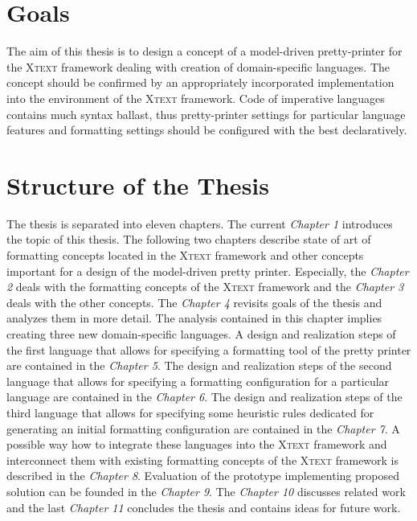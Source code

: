 \documentclass[12pt,notitlepage,a4paper]{report}
\begin{document}
\section{Goals}

The aim of this thesis is to design a concept of a model-driven pretty-printer for the \textsc{Xtext} framework \cite{Xtext} dealing with creation of domain-specific languages. The concept should be confirmed by an appropriately incorporated implementation into the environment of the \textsc{Xtext} framework. Code of imperative languages contains much syntax ballast, thus pretty-printer settings for particular language features and formatting settings should be configured with the best declaratively.

\section{Structure of the Thesis}

The thesis is separated into eleven chapters. The current \textit{Chapter 1} introduces the topic of this thesis. The following two chapters describe state of art of formatting concepts located in the \textsc{Xtext} framework and other concepts important for a design of the model-driven pretty printer. Especially, the \textit{Chapter 2} deals with the formatting concepts of the \textsc{Xtext} framework and the \textit{Chapter 3} deals with the other concepts. The \textit{Chapter 4} revisits goals of the thesis and analyzes them in more detail. The analysis contained in this chapter implies creating three new domain-specific languages. A design and realization steps of the first language that allows for specifying a formatting tool of the pretty printer are contained in the \textit{Chapter 5}.  The design and realization steps of the second language that allows for specifying a formatting configuration for a particular language are contained in the \textit{Chapter 6}. The design and realization steps of the third language that allows for specifying some heuristic rules dedicated for generating an initial formatting configuration are contained in the \textit{Chapter 7}. A possible way how to integrate these languages into the \textsc{Xtext} framework and interconnect them with existing formatting concepts of the \textsc{Xtext} framework is described in the \textit{Chapter 8}. Evaluation of the prototype implementing proposed solution can be founded  in the \textit{Chapter 9}. The \textit{Chapter 10} discusses related work and the last \textit{Chapter 11} concludes the thesis and contains ideas for future work.
\end{document}
